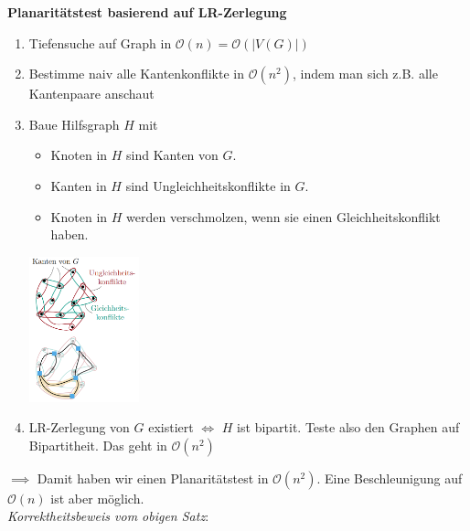 \textbf{Planaritätstest basierend auf LR-Zerlegung}
\begin{enumerate}
	\item Tiefensuche auf Graph in $\mathcal{O}(n)=\mathcal{O}(|V(G)|)$
	\item Bestimme naiv alle Kantenkonflikte in $\mathcal{O}(n^2)$, indem man sich z.B. alle Kantenpaare anschaut
	\item Baue Hilfsgraph $H$ mit
	\begin{itemize}
		\item Knoten in $H$ sind Kanten von $G$.
		\item Kanten in $H$ sind Ungleichheitskonflikte in $G$.
		\item Knoten in $H$ werden verschmolzen, wenn sie einen Gleichheitskonflikt haben.
	\end{itemize}
	\begin{center}
		\includegraphics[width=0.25\textwidth]{images/planar-test.png}
	\end{center}
	\item LR-Zerlegung von $G$ existiert $\iff$ $H$ ist bipartit. Teste also den Graphen auf Bipartitheit. Das geht in $\mathcal{O}(n^2)$
\end{enumerate}
$\implies$ Damit haben wir einen Planaritätstest in $\mathcal{O}(n^2)$. Eine Beschleunigung auf $\mathcal{O}(n)$ ist aber möglich.\\

\textit{Korrektheitsbeweis vom obigen Satz}:
